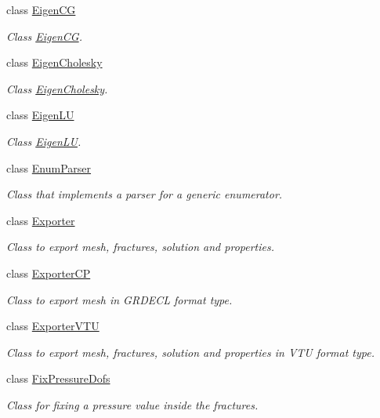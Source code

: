 \begin{DoxyCompactItemize}
class \hyperlink{classFVCode3D_1_1EigenCG}{Eigen\+CG}
\begin{DoxyCompactList}\small\item\em Class \hyperlink{classFVCode3D_1_1EigenCG}{Eigen\+CG}. \end{DoxyCompactList}\item 
class \hyperlink{classFVCode3D_1_1EigenCholesky}{Eigen\+Cholesky}
\begin{DoxyCompactList}\small\item\em Class \hyperlink{classFVCode3D_1_1EigenCholesky}{Eigen\+Cholesky}. \end{DoxyCompactList}\item 
class \hyperlink{classFVCode3D_1_1EigenLU}{Eigen\+LU}
\begin{DoxyCompactList}\small\item\em Class \hyperlink{classFVCode3D_1_1EigenLU}{Eigen\+LU}. \end{DoxyCompactList}\item 
class \hyperlink{classFVCode3D_1_1EnumParser}{Enum\+Parser}
\begin{DoxyCompactList}\small\item\em Class that implements a parser for a generic enumerator. \end{DoxyCompactList}\item 
class \hyperlink{classFVCode3D_1_1Exporter}{Exporter}
\begin{DoxyCompactList}\small\item\em Class to export mesh, fractures, solution and properties. \end{DoxyCompactList}\item 
class \hyperlink{classFVCode3D_1_1ExporterCP}{Exporter\+CP}
\begin{DoxyCompactList}\small\item\em Class to export mesh in G\+R\+D\+E\+CL format type. \end{DoxyCompactList}\item 
class \hyperlink{classFVCode3D_1_1ExporterVTU}{Exporter\+V\+TU}
\begin{DoxyCompactList}\small\item\em Class to export mesh, fractures, solution and properties in V\+TU format type. \end{DoxyCompactList}\item 
class \hyperlink{classFVCode3D_1_1FixPressureDofs}{Fix\+Pressure\+Dofs}
\begin{DoxyCompactList}\small\item\em Class for fixing a pressure value inside the fractures. \end{DoxyCompactList}\item 

\end{DoxyCompactItemize}
